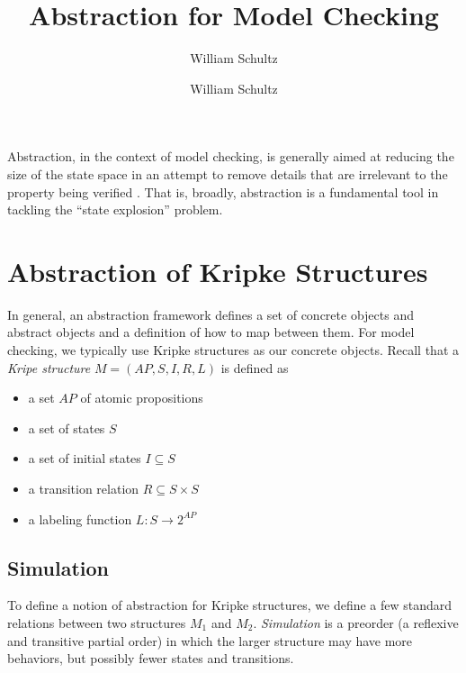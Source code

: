 \documentclass[10pt,a4paper]{article}
\author{William Schultz}
\begin{document}
\title{Abstraction for Model Checking}
\author{William Schultz}
\maketitle

Abstraction, in the context of model checking, is generally aimed at reducing the size of the state space in an attempt to remove details that are irrelevant to the property being verified \cite{Dams2018}. That is, broadly, abstraction is a fundamental tool in tackling the ``state explosion'' problem.


\section*{Abstraction of Kripke Structures}

In general, an abstraction framework defines a set of concrete objects and abstract objects and a definition of how to map between them. For model checking, we typically use Kripke structures as our concrete objects. Recall that a \textit{Kripe structure} $M=(AP,S,I,R,L)$ is defined as
\begin{itemize}
    \item a set $AP$ of atomic propositions
    \item a set of states $S$
    \item a set of initial states $I \subseteq S$
    \item a transition relation $R \subseteq S \times S$
    \item a labeling function $L : S \rightarrow 2^{AP}$
\end{itemize}

\subsection*{Simulation}
To define a notion of abstraction for Kripke structures, we define a few standard relations between two structures $M_1$ and $M_2$. \textit{Simulation} is a preorder (a reflexive and transitive partial order) in which the larger structure may have more behaviors, but possibly fewer states and transitions.
\end{document}
